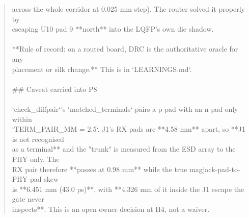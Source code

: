 \documentclass[11pt,a4paper]{article}
\begin{document}
\begin{quote}
across the whole corridor at 0.025 mm step). The router solved it properly by\\
escaping U10 pad 9 {*}{*}north{*}{*} into the LQFP's own die shadow.\\
~\\
{*}{*}Rule of record: on a routed board, DRC is the authoritative oracle for any\\
placement or silk change.{*}{*} This is in `LEARNINGS.md`.\\
~\\
\#\# Caveat carried into P8\\
~\\
`check\_diffpair`'s `matched\_terminals` pairs a p-pad with an n-pad only within\\
`TERM\_PAIR\_MM = 2.5`. J1's RX pads are {*}{*}4.58 mm{*}{*} apart, so {*}{*}J1 is not recognised\\
as a terminal{*}{*} and the "trunk" is measured from the ESD array to the PHY only. The\\
RX pair therefore {*}{*}passes at 0.98 mm{*}{*} while the true magjack-pad-to-PHY-pad skew\\
is {*}{*}6.451 mm (43.0 ps){*}{*}, with {*}{*}4.326 mm of it inside the J1 escape the gate never\\
inspects{*}{*}. This is an open owner decision at H4, not a waiver.
\end{quote}
\end{document}

